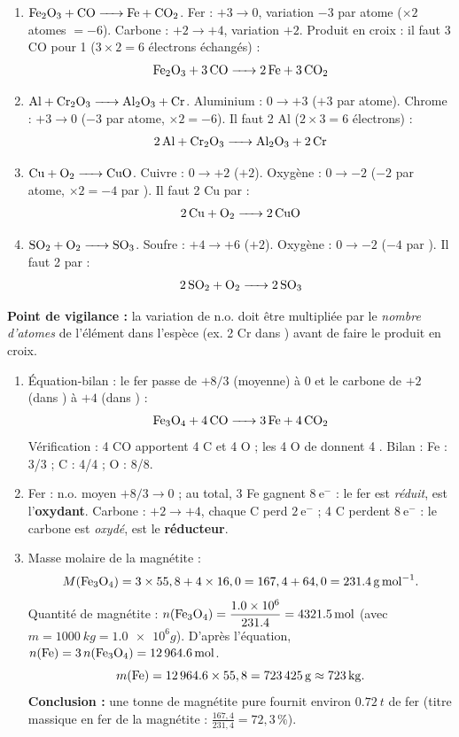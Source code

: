 \documentclass[11pt]{article}
\begin{document}
\begin{corrige}
\begin{enumerate}
\item $\ce{Fe2O3 + CO -> Fe + CO2}$. Fer : $+3 \to 0$, variation $-3$ par atome ($\times 2$ atomes $= -6$). Carbone : $+2 \to +4$, variation $+2$. Produit en croix : il faut 3 CO pour 1  ($3 \times 2 = 6$ électrons échangés) :
\[ \ce{Fe2O3 + 3 CO -> 2 Fe + 3 CO2} \]
\item $\ce{Al + Cr2O3 -> Al2O3 + Cr}$. Aluminium : $0 \to +3$ ($+3$ par atome). Chrome : $+3 \to 0$ ($-3$ par atome, $\times 2 = -6$). Il faut 2 Al ($2 \times 3 = 6$ électrons) :
\[ \ce{2 Al + Cr2O3 -> Al2O3 + 2 Cr} \]
\item $\ce{Cu + O2 -> CuO}$. Cuivre : $0 \to +2$ ($+2$). Oxygène : $0 \to -2$ ($-2$ par atome, $\times 2 = -4$ par ). Il faut 2 Cu par  :
\[ \ce{2 Cu + O2 -> 2 CuO} \]
\item $\ce{SO2 + O2 -> SO3}$. Soufre : $+4 \to +6$ ($+2$). Oxygène : $0 \to -2$ ($-4$ par ). Il faut 2  par  :
\[ \ce{2 SO2 + O2 -> 2 SO3} \]
\end{enumerate}
\textbf{Point de vigilance :} la variation de n.o. doit être multipliée par le \emph{nombre d'atomes} de l'élément dans l'espèce (ex. 2 Cr dans ) avant de faire le produit en croix.
\end{corrige}

\begin{corrige}
\begin{enumerate}
\item Équation-bilan : le fer passe de $+8/3$ (moyenne) à $0$ et le carbone de $+2$ (dans ) à $+4$ (dans ) :
\[ \ce{Fe3O4 + 4 CO -> 3 Fe + 4 CO2} \]
Vérification : 4 CO apportent 4 C et 4 O ; les 4 O de  donnent 4 . Bilan : Fe : 3/3 ; C : 4/4 ; O : 8/8.
\item Fer : n.o. moyen $+8/3 \to 0$ ; au total, 3 Fe gagnent $8\ \text{e}^-$ : le fer est \emph{réduit},  est l'\textbf{oxydant}. Carbone : $+2 \to +4$, chaque C perd $2\ \text{e}^-$ ; 4 C perdent $8\ \text{e}^-$ : le carbone est \emph{oxydé},  est le \textbf{réducteur}.
\item Masse molaire de la magnétite :
\[ M(\ce{Fe3O4}) = 3 \times 55,8 + 4 \times 16,0 = 167,4 + 64,0 = \SI{231,4}{g.mol^{-1}}. \]
Quantité de magnétite : $n(\ce{Fe3O4}) = \dfrac{\num{1,0e6}}{\num{231,4}} = \SI{4321,5}{mol}$ (avec $m = \SI{1000}{kg} = \num{1,0e6}{g}$).
D'après l'équation, $n(\ce{Fe}) = 3\,n(\ce{Fe3O4}) = \SI{12964,6}{mol}$.
\[ m(\ce{Fe}) = \num{12964,6} \times 55,8 = \SI{723425}{g} \approx \SI{723}{kg}. \]
\textbf{Conclusion :} une tonne de magnétite pure fournit environ $\SI{0,72}{t}$ de fer (titre massique en fer de la magnétite : $\frac{167,4}{231,4} = 72,3\,\%$).
\end{enumerate}
\end{corrige}
\end{document}
